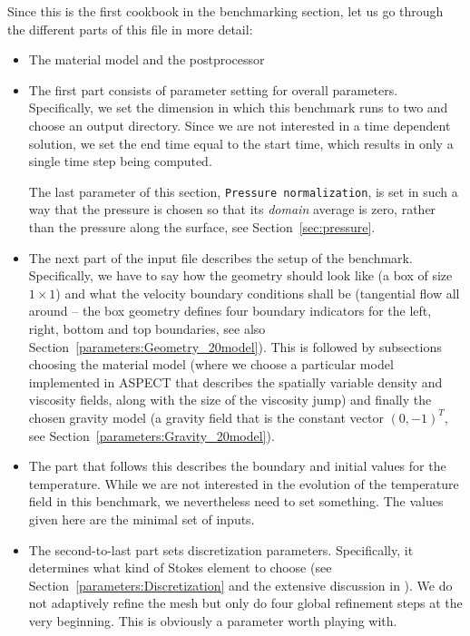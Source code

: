 \documentclass{article}
\newcommand{\aspect}{\textsc{ASPECT}}
\begin{document}
Since this is the first cookbook in the benchmarking section, let us go
through the different parts of this file in more detail:
\begin{itemize}
\item The material model and the postprocessor 
\item The first part consists of parameter setting for overall
  parameters. Specifically, we set the dimension in which this benchmark runs
  to two and choose an output directory. Since we are not interested in a time
  dependent solution, we set the end time equal to the start time, which
  results in only a single time step being computed.

  The last parameter of this section, \texttt{Pressure normalization},
  is set in such a way that the pressure is chosen so that its \textit{domain}
  average is zero, rather than the pressure along the surface, see
  Section~\ref{sec:pressure}.

\item The next part of the input file describes the setup of the
  benchmark. Specifically, we have to say how the geometry should look like (a
  box of size $1\times 1$) and what the velocity boundary conditions shall be
  (tangential flow all around -- the box geometry defines four boundary
  indicators for the left, right, bottom and top boundaries, see also
  Section~\ref{parameters:Geometry_20model}). This is followed by subsections
  choosing the material model (where we choose a particular model implemented
  in \aspect{} that describes the spatially variable density and viscosity
  fields, along with the size of the viscosity jump) and finally the chosen
  gravity model (a gravity field that is the constant vector $(0,-1)^T$, see
  Section~\ref{parameters:Gravity_20model}).

\item The part that follows this describes the boundary and initial values for
  the temperature. While we are not interested in the evolution of the
  temperature field in this benchmark, we nevertheless need to set
  something. The values given here are the minimal set of inputs.

\item The second-to-last part sets discretization parameters. Specifically, it
  determines what kind of Stokes element to choose (see
  Section~\ref{parameters:Discretization} and the extensive discussion in
  \cite{KHB12}). We do not adaptively refine the mesh but only do four global
  refinement steps at the very beginning. This is obviously a parameter worth
  playing with.


\end{itemize}
\end{document}
